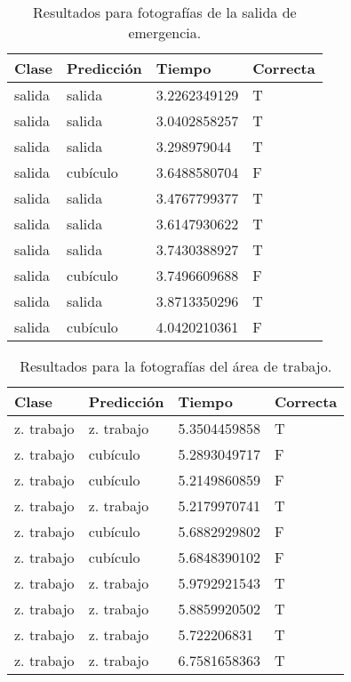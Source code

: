 \begin{table}[H]
\centering
\begin{tabular}{|l|l|l|l|}
\hline
Clase & Predicción & Tiempo        & Correcta \\ \hline
salida  & salida       & 3.2262349129 & T     \\ \hline
salida  & salida       & 3.0402858257 & T     \\ \hline
salida  & salida     & 3.298979044  & T    \\ \hline
salida  & cubículo     & 3.6488580704 & F    \\ \hline
salida  & salida       & 3.4767799377 & T     \\ \hline
salida  & salida       & 3.6147930622 & T     \\ \hline
salida  & salida       & 3.7430388927 & T     \\ \hline
salida  & cubículo     & 3.7496609688 & F    \\ \hline
salida  & salida       & 3.8713350296 & T     \\ \hline
salida  & cubículo     & 4.0420210361 & F    \\ \hline
\end{tabular}
\caption{Resultados para fotografías de la salida de emergencia.}
\label{table:exit}
\end{table}

\begin{table}[H]
\centering
\begin{tabular}{|l|l|l|l|}
\hline
Clase      & Predicción & Tiempo        & Correcta \\ \hline
z. trabajo & z. trabajo & 5.3504459858 & T        \\ \hline
z. trabajo & cubículo    & 5.2893049717 & F        \\ \hline
z. trabajo & cubículo    & 5.2149860859 & F        \\ \hline
z. trabajo & z. trabajo & 5.2179970741 & T        \\ \hline
z. trabajo & cubículo    & 5.6882929802 & F        \\ \hline
z. trabajo & cubículo    & 5.6848390102 & F        \\ \hline
z. trabajo & z. trabajo & 5.9792921543 & T        \\ \hline
z. trabajo & z. trabajo & 5.8859920502 & T        \\ \hline
z. trabajo & z. trabajo & 5.722206831  & T        \\ \hline
z. trabajo & z. trabajo & 6.7581658363 & T        \\ \hline
\end{tabular}
\caption{Resultados para la fotografías del área
de trabajo.}
\label{table:desks}
\end{table}

